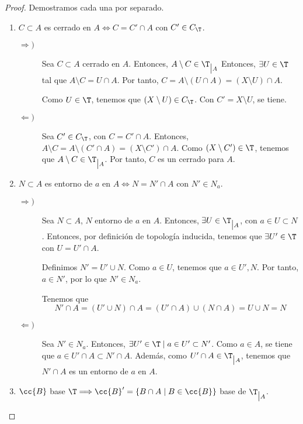 \begin{proof} Demostramos cada una por separado.
\begin{enumerate}
    \item $C\subset A$ es cerrado en $A \Longleftrightarrow C=C'\cap A$ con $C'\in C_\T$.
    \begin{description}
        \item[$\Longrightarrow)$]
            Sea $C\subset A$ cerrado en $A$. Entonces, $A\setminus C\in \T_{\big| A}$ Entonces, $\exists U\in \T$ tal que $A\setminus C=U\cap A$. Por tanto, $C=A\setminus (U\cap A) = (X\setminus U)\cap A$.

            Como $U\in \T$, tenemos que $(X\setminus U)\in C_\T$. Con $C'=X\setminus U$, se tiene.
            
        \item[$\Longleftarrow)$] Sea $C'\in C_\T$, con $C=C'\cap A$. Entonces, $A\setminus C = A\setminus (C'\cap A) = (X\setminus C')\cap A$. Como $(X\setminus C')\in \T$, tenemos que $A\setminus C\in \T_{\big| A}$. Por tanto, $C$ es un cerrado para $A$.
    \end{description}

    
    \item $N\subset A$ es entorno de $a$ en $A \Longleftrightarrow N=N'\cap A$ con $N'\in N_a$.
    \begin{description}
        \item[$\Longrightarrow)$]
            Sea $N\subset A$, $N$ entorno de $a$ en $A$. Entonces, $\exists U\in \T_{\big|A}$, con $a\in U\subset N$. Entonces, por definición de topología inducida, tenemos que $\exists U'\in \T$ con $U=U'\cap A$.
            
            Definimos $N'=U'\cup N$. Como $a\in U$, tenemos que $a\in U', N$. Por tanto, $a\in N'$, por lo que $N'\in N_a$.

            Tenemos que 
            $$N'\cap A = (U'\cup N)\cap A = (U'\cap A)\cup (N\cap A)=U\cup N=N$$
            
        \item[$\Longleftarrow)$] Sea $N'\in N_a$. Entonces, $\exists U'\in \T\mid a\in U'\subset N'$. Como $a\in A$, se tiene que $a\in U'\cap A\subset N'\cap A$. Además, como $U'\cap A\in \T_{\big| A}$, tenemos que $N'\cap A$ es un entorno de $a$ en $A$.
    \end{description}
    

    
    \item $\cc{B}$ base $\T \Longrightarrow \cc{B}'=\{B\cap A\mid B\in \cc{B}\}$ base de $\T_{\big| A}$.


\end{enumerate}
\end{proof}
